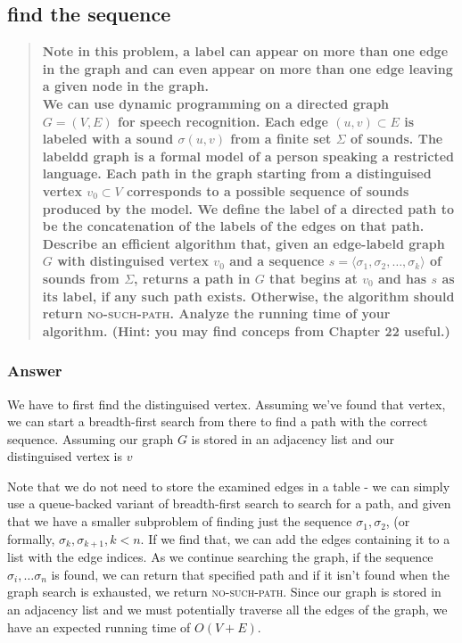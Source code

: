 \documentclass[titlepage]{article}\usepackage[]{graphicx}\usepackage[]{color}
\begin{document}
	\subsection{find the sequence}
\begin{quote}
	\textbf{Note in this problem, a label can appear on more than one edge in the graph
		and can even appear on more than one edge leaving a given node in the graph.
		\\
		We can use dynamic programming on a directed graph $G = (V,E)$ for speech
		recognition. Each edge $(u,v) \subset E$ is labeled with a sound
		$\sigma(u,v)$ from a finite set $\Sigma$ of sounds. The labeldd graph is a
		formal model of a person speaking a restricted language. Each path in the graph
		starting from a distinguised vertex $v_0 \subset V$ corresponds to a possible
		sequence of sounds produced by the model. We define the label of a directed
		path to be the concatenation of the labels of the edges on that path. 
		Describe an efficient algorithm that, given an edge-labeld graph
		$G$ with distinguised vertex $v_0$ and a sequence $s = \langle \sigma_1,
		\sigma_2, \dots, \sigma_k \rangle$ of sounds from $\Sigma$, returns a path in
		$G$ that begins at $v_0$ and has $s$ as its label, if any such path exists.
		Otherwise, the algorithm should return \textsc{no-such-path}. Analyze the
		running time of your algorithm. (Hint: you may find conceps from Chapter 22
	useful.)}
\end{quote}

\subsubsection{Answer}
We have to first find the distinguised vertex. Assuming we've found that
vertex, we can start a breadth-first search from there to find a path with the
correct sequence. Assuming our graph $G$ is stored in an adjacency list and our
distinguised vertex is $v$

Note that we do not need to store the examined edges in a table - we can simply
use a queue-backed variant of breadth-first search to search for a path, and
given that we have a smaller subproblem of finding just the sequence $\sigma_1,
\sigma_2$, (or formally, $\sigma_k, \sigma_{k+1}, k<n$. If we find that, we can add the edges containing it to a list with
the edge indices. As we continue searching the graph, if the sequence
$\sigma_i, \dots \sigma_n$ is found, we can return that specified path and if
it isn't found when the graph search is exhausted, we return
\textsc{no-such-path}. 
Since our graph is stored in an adjacency list and we must potentially traverse
all the edges of the graph, we have an expected running time of $O(V+E)$. 
  	
\end{document}
